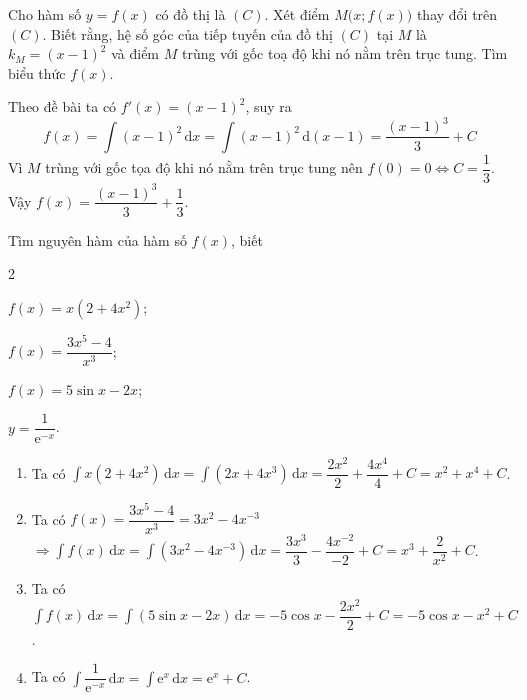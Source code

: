 \documentclass[12pt,aspectratio=169]{beamer}
\begin{document}
\begin{baitap}%
	Cho hàm số $y = f(x)$ có đồ thị là $(C)$. Xét điểm $M\big(x; f(x)\big)$ thay đổi trên $(C)$. Biết rằng, hệ số góc của tiếp tuyến của đồ thị $(C)$ tại $M$ là $k_M = (x - 1)^2$ và điểm $M$ trùng với gốc toạ độ khi nó nằm trên trục tung. Tìm biểu thức $f(x)$.

	\begin{loigiai}
		Theo đề bài ta có $f'(x)=(x-1)^2$, suy ra
		\[f(x)= \int (x-1)^2\mathrm{\,d}x=\int (x-1)^2\mathrm{\,d}(x-1)=\dfrac{(x-1)^3}{3}+C\]
		Vì $M$ trùng với gốc tọa độ khi nó nằm trên trục tung nên
		$ f(0)=0\Leftrightarrow C=\dfrac{1}{3}.$\\
		Vậy $f(x)=\dfrac{(x-1)^3}{3}+\dfrac{1}{3}$.
	\end{loigiai}
\end{baitap}

\begin{baitap}%
	Tìm nguyên hàm của hàm số $f(x)$, biết
	\begin{enumEX}{2}
		\item $f(x)=x\left(2+4x^2\right)$;
		\item $f(x)=\dfrac{3x^5-4}{x^3}$;
		\item $f(x)=5\sin x - 2x$;
		\item $y=\dfrac{1}{\mathrm{e}^{-x}}$.
	\end{enumEX}

	\begin{loigiai}
		\begin{enumerate}
			\item Ta có $\displaystyle\int x\left(2+4x^2\right)\mathrm{\,d}x=\displaystyle\int\left(2x+4x^3\right)\mathrm{\,d}x=\dfrac{2x^2}{2}+\dfrac{4x^4}{4}+C=x^2+x^4+C$.
			\item Ta có $f(x)=\dfrac{3x^5-4}{x^3}=3x^2-4x^{-3}$\\ $\Rightarrow \displaystyle\int f(x)\mathrm{\,d}x=\displaystyle\int\left(3x^2-4x^{-3}\right)\mathrm{\,d}x=\dfrac{3x^3}{3}-\dfrac{4x^{-2}}{-2}+C=x^3+\dfrac{2}{x^2}+C$.
			\item Ta có $\displaystyle \int f(x)\mathrm{\,d}x
			=\int (5\sin x - 2x)\mathrm{\,d}x = -5\cos x-\dfrac{2x^2}{2}+C=-5\cos x-x^2+C$.
			\item Ta có $\displaystyle \int \dfrac{1}{\mathrm{e}^{-x}} \mathrm{\,d}x=\int \mathrm{e}^x\mathrm{\,d}x=\mathrm{e}^x+C$.
		\end{enumerate}
	\end{loigiai}
\end{baitap}
\end{document}
